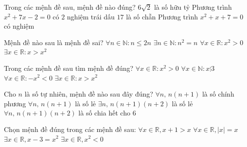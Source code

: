 
 \begin{ex}%
 	Trong các mệnh đề sau, mệnh đề nào đúng?
 	\choice
 	{$6 \sqrt{2}$ là số hữu tỷ}
 	{\True Phương trình $x^2+7x-2=0$ có $2$ nghiệm trái dấu}
 	{$17$ là số chẵn}
 	{Phương trình $x^2+x+7=0$ có nghiệm}
 \end{ex}
 
 \begin{ex}%
 	Mệnh đề nào sau là mệnh đề sai?
 	\choice
 	{$\forall n \in \mathbb{N} \colon n \leq 2 n$}
 	{$\exists n \in \mathbb{N} \colon n^2=n$}
 	{\True $\forall x \in \mathbb{R}\colon x^2>0$}
 	{$\exists x \in \mathbb{R}\colon x>x^2$}
 \end{ex}
 
 \begin{ex}%
 	Trong các mệnh đề sau tìm mệnh đề đúng?
 	\choice
 	{$\forall x \in \mathbb{R}\colon x^2>0$}
 	{$\forall x \in \mathbb{N}\colon x\vdots 3$}
 	{$\forall x \in \mathbb{R}\colon-x^2<0$}
 	{\True $\exists x \in \mathbb{R}\colon x>x^2$}
 \end{ex}
 
 \begin{ex}%
 	Cho $n$ là số tự nhiên, mệnh đề nào sau đây đúng?
 	\choice
 	{$\forall n,\,n\left(n+1\right)$ là số chính phương}
 	{$\forall n,\,n\left(n+1\right)$ là số lẻ}
 	{$\exists n,\,n\left(n+1\right)\left(n+2\right)$ là số lẻ}
 	{\True $\forall n,\,n\left(n+1\right)\left(n+2\right)$ là số chia hết cho $6$}
 \end{ex}
 
 \begin{ex}%
 	Chọn mệnh đề đúng trong các mệnh đề sau:
 	\choice
 	{\True $\forall x\in \mathbb{R}, x+1 > x$}
 	{$\forall x\in \mathbb{R}, \left| x\right|=x$}
 	{$\exists x\in \mathbb{R}, x-3=x^2$}
 	{$\exists x\in \mathbb{R}, x^2< 0$}
 \end{ex}
 

